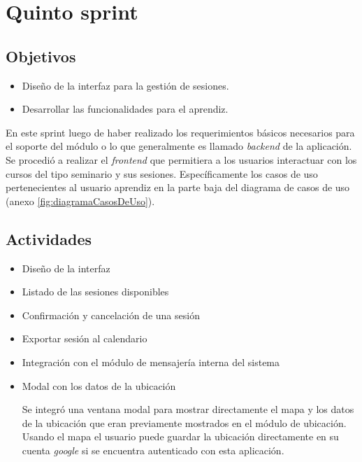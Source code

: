 ﻿\section{Quinto sprint} %
\label{sec:quinto_sprint}

\subsection{Objetivos}

\begin{itemize}
	\item Diseño de la interfaz para la gestión de sesiones.
	\item Desarrollar las funcionalidades para el aprendiz.
\end{itemize}

En este sprint luego de haber realizado los requerimientos básicos necesarios para el soporte del módulo o lo que generalmente es llamado \emph{backend} de la aplicación. Se procedió a realizar el \emph{frontend} que permitiera a los usuarios interactuar con los cursos del tipo seminario y sus sesiones. Específicamente los casos de uso pertenecientes al usuario aprendiz en la parte baja del diagrama de casos de uso (anexo \ref{fig:diagramaCasosDeUso}).

\subsection{Actividades} %
\label{sub:actividades5}

\begin{itemize}

\item Diseño de la interfaz
\item Listado de las sesiones disponibles
\item Confirmación y cancelación de una sesión
\item Exportar sesión al calendario
\item Integración con el módulo de mensajería interna del sistema
\item Modal con los datos de la ubicación

	Se integró una ventana modal para mostrar directamente el mapa y los datos de la ubicación que eran previamente mostrados en el módulo de ubicación. Usando el mapa el usuario puede guardar la ubicación directamente en su cuenta \emph{google} si se encuentra autenticado con esta aplicación.

\end{itemize}


